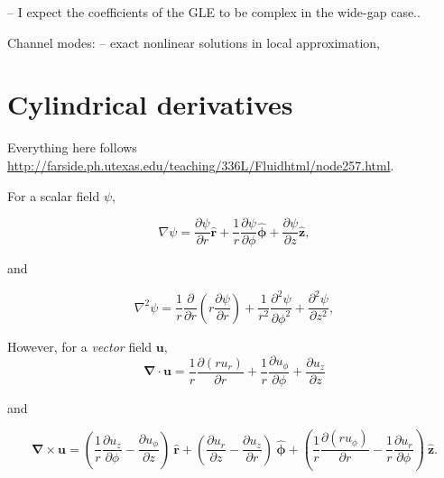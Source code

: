 \documentclass{paper}
\newcommand{\uphi}{\ensuremath{u_\phi}}
\newcommand{\rhat}{\ensuremath{\mathbf{\hat{r}}}}
\newcommand{\phihat}{\ensuremath{\mathbf{\hat{\phi}}}}
\newcommand{\zhat}{\ensuremath{\mathbf{\hat{z}}}}
\begin{document}
-- I expect the coefficients of the GLE to be complex in the wide-gap case..

Channel modes:
-- exact nonlinear solutions in local approximation, 



\appendix

\section{Cylindrical derivatives}
\label{sec:cylindrical_deriv}

Everything here follows \url{http://farside.ph.utexas.edu/teaching/336L/Fluidhtml/node257.html}.

For a scalar field $\psi$, 

\begin{equation}
  \label{eq:del_scalar}
  \nabla \psi = \frac{\partial \psi}{\partial r} \rhat + \frac{1}{r} \frac{\partial \psi}{\partial \phi} \phihat + \frac{\partial \psi}{\partial z} \zhat,
\end{equation}

and

\begin{equation}
  \label{eq:del2_scalar}
  \nabla^2 \psi = \frac{1}{r} \frac{\partial}{\partial r}\left(r \frac{\partial \psi}{\partial r} \right) + \frac{1}{r^2} \frac{\partial^2 \psi}{\partial \phi^2} + \frac{\partial^2 \psi}{\partial z^2},
\end{equation}

However, for a \emph{vector} field $\mathbf{u}$,
\begin{equation}
  \label{eq:div}
  \mathbf{\nabla \cdot u} = \frac{1}{r} \frac{\partial (r u_r)}{\partial r} + \frac{1}{r} \frac{\partial \uphi}{\partial \phi}  + \frac{\partial u_z}{\partial z}
\end{equation}

and 

\begin{equation}
  \label{eq:curl}
  \mathbf{\nabla \times u} = \left( \frac{1}{r} \frac{\partial u_z}{\partial \phi} - \frac{\partial u_\phi}{\partial z}\right)\ \rhat + \left(\frac{\partial u_r}{\partial z} - \frac{\partial u_z}{\partial r}\right)\ \phihat  + \left( \frac{1}{r} \frac{\partial (r \uphi)}{\partial r} - \frac{1}{r}\frac{\partial u_r}{\partial \phi}\right)\ \zhat.
\end{equation}
\end{document}
